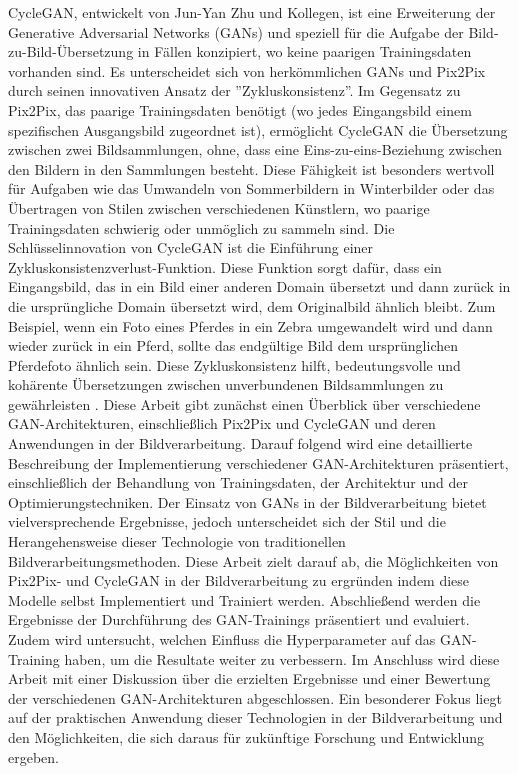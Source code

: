 \newline
CycleGAN, entwickelt von Jun-Yan Zhu und Kollegen, ist eine Erweiterung der Generative Adversarial Networks (GANs) und speziell für die Aufgabe der Bild-zu-Bild-Übersetzung in Fällen konzipiert, wo keine paarigen Trainingsdaten vorhanden sind. Es unterscheidet sich von herkömmlichen GANs und Pix2Pix durch seinen innovativen Ansatz der ''Zykluskonsistenz''.
Im Gegensatz zu Pix2Pix, das paarige Trainingsdaten benötigt (wo jedes Eingangsbild einem spezifischen Ausgangsbild zugeordnet ist), ermöglicht CycleGAN die Übersetzung zwischen zwei Bildsammlungen, ohne, dass eine Eins-zu-eins-Beziehung zwischen den Bildern in den Sammlungen besteht. Diese Fähigkeit ist besonders wertvoll für Aufgaben wie das Umwandeln von Sommerbildern in Winterbilder oder das Übertragen von Stilen zwischen verschiedenen Künstlern, wo paarige Trainingsdaten schwierig oder unmöglich zu sammeln sind.
Die Schlüsselinnovation von CycleGAN ist die Einführung einer Zykluskonsistenzverlust-Funktion. Diese Funktion sorgt dafür, dass ein Eingangsbild, das in ein Bild einer anderen Domain übersetzt und dann zurück in die ursprüngliche Domain übersetzt wird, dem Originalbild ähnlich bleibt. Zum Beispiel, wenn ein Foto eines Pferdes in ein Zebra umgewandelt wird und dann wieder zurück in ein Pferd, sollte das endgültige Bild dem ursprünglichen Pferdefoto ähnlich sein. Diese Zykluskonsistenz hilft, bedeutungsvolle und kohärente Übersetzungen zwischen unverbundenen Bildsammlungen zu gewährleisten \cite{Zhu.2017}.\newline
Diese Arbeit gibt zunächst einen Überblick über verschiedene GAN-Architekturen, einschließlich Pix2Pix und CycleGAN und deren Anwendungen in der Bildverarbeitung. Darauf folgend wird eine detaillierte Beschreibung der Implementierung verschiedener GAN-Architekturen präsentiert, einschließlich der Behandlung von Trainingsdaten, der Architektur und der Optimierungstechniken. \newline
Der Einsatz von GANs in der Bildverarbeitung bietet vielversprechende Ergebnisse, jedoch unterscheidet sich der Stil und die Herangehensweise dieser Technologie von traditionellen Bildverarbeitungsmethoden. Diese Arbeit zielt darauf ab, die Möglichkeiten von Pix2Pix- und CycleGAN in der Bildverarbeitung zu ergründen indem diese Modelle selbst Implementiert und Trainiert werden. \newline
Abschließend werden die Ergebnisse der Durchführung des GAN-Trainings präsentiert und evaluiert. Zudem wird untersucht, welchen Einfluss die Hyperparameter auf das GAN-Training haben, um die Resultate weiter zu verbessern. \newline 
Im Anschluss wird diese Arbeit mit einer Diskussion über die erzielten Ergebnisse und einer Bewertung der verschiedenen GAN-Architekturen abgeschlossen. Ein besonderer Fokus liegt auf der praktischen Anwendung dieser Technologien in der Bildverarbeitung und den Möglichkeiten, die sich daraus für zukünftige Forschung und Entwicklung ergeben. \newline 
